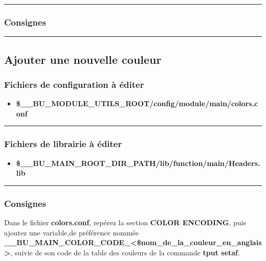 \documentclass[a4paper,10pt]{article}
\begin{document}

\color{blue}\par\noindent\rule{\textwidth}{0.4pt}\color{white}

\color{blue}
\subsubsection{Consignes}\color{white}



\color{green}\par\noindent\rule{\textwidth}{0.4pt}\color{white}

\color{green}
\subsection{Ajouter une nouvelle couleur}\color{white}

\color{blue}
\subsubsection{Fichiers de configuration à éditer}\color{white}
\begin{itemize}
    \item \textbf{\color{orange}\$\_\_BU\_MODULE\_UTILS\_ROOT\color{lime}/config/module/main/colors.conf}
\end{itemize}



\color{blue}\par\noindent\rule{\textwidth}{0.4pt}\color{white}

\color{blue}
\subsubsection{Fichiers de librairie à éditer}\color{white}
\begin{itemize}
    \item \textbf{\color{orange}\$\_\_BU\_MAIN\_ROOT\_DIR\_PATH\color{lime}/lib/function/main/Headers.lib}
\end{itemize}



\color{blue}\par\noindent\rule{\textwidth}{0.4pt}\color{white}

\color{blue}
\subsubsection{Consignes}\color{white}
Dans le fichier \textbf{\color{lime}colors.conf}, repérez la section \textbf{COLOR ENCODING}, puis ajoutez une variable,\linebreak de préférence nommée \textbf{\color{orange}\_\_BU\_MAIN\_COLOR\_CODE\_<\$nom\_de\_la\_couleur\_en\_anglais>}, suivie de son code de la table des couleurs de la commande \textbf{\color{gray}tput setaf}.\\[1\baselineskip]
\end{document}
